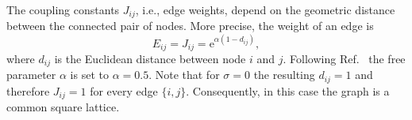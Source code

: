     The coupling constants \(J_{ij}\), i.e., edge weights, depend on the
    geometric distance between the connected pair of nodes. More precise,
    the weight of an edge is
    \begin{equation}
        E_{ij} = J_{ij} = \mathrm{e}^{\alpha (1-d_{ij})},
        \label{eq:coupling}
    \end{equation}
    where \(d_{ij}\) is the Euclidean
    distance between node \(i\) and \(j\). Following Ref.~\cite{Lima2000}
    the free parameter \(\alpha\) is set to \(\alpha = 0.5\).
    Note that for \(\sigma = 0\) the resulting \(d_{ij} = 1\) and therefore
    \(J_{ij} = 1\) for every edge $\{i,j\}$. Consequently, in this case
    the graph is a common square lattice.
